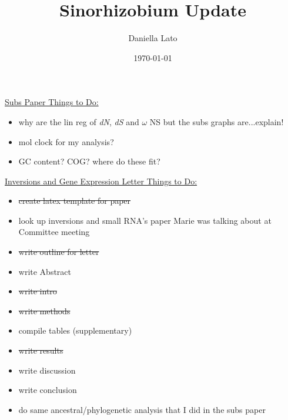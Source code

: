\documentclass[12pt]{article}
\title{Sinorhizobium Update}
\author{Daniella Lato}
\date{\today}
\newcommand{\p}{progressiveMauve\xspace}
\newcommand{\ecoli}{\textit{Escherichia coli}\xspace}
\newcommand{\dn}{\textit{dN}\xspace}
\newcommand{\ds}{\textit{dS}\xspace}
\begin{document}
\underline{Subs Paper Things to Do:}
\begin{itemize}


%    
%    
	\item why are the lin reg of \dn, \ds and $\omega$ NS but the subs graphs are...explain!

	\item mol clock for my analysis?
	
	\item GC content? COG? where do these fit?
	
\end{itemize}

\underline{Inversions and Gene Expression Letter Things to Do:}
\begin{itemize}
%	
%	
%	
%	
%	
	\item \sout{create latex template for paper}


	\item look up inversions and small RNA's paper Marie was talking about at Committee meeting
	\item \sout{write outline for letter}
	\item write Abstract
	\item \sout{write intro}
	\item\sout{ write methods}
	\item compile tables (supplementary)
	\item \sout{write results}
	\item write discussion
	\item write conclusion 
	\item do same ancestral/phylogenetic analysis that I did in the subs paper 
\end{itemize}
\end{document}
